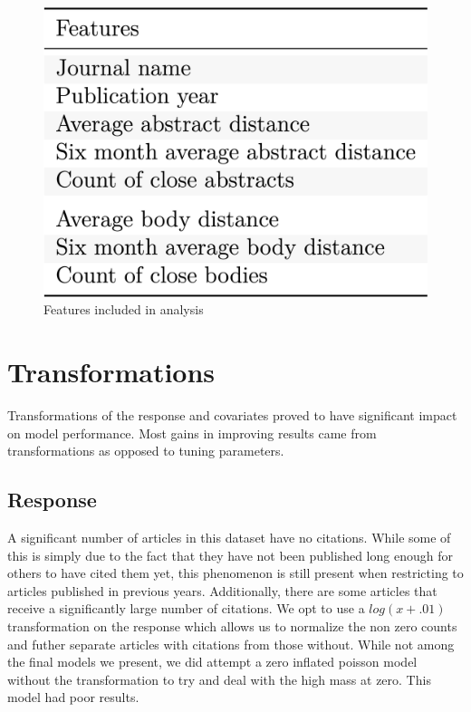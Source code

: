 \documentclass{article} %
\begin{document}
\begin{figure}[h]
\begin{center}
  \includegraphics[scale=0.17]{../Figures/features.png}
\end{center}
\caption{Features included in analysis}
\label{features}
\end{figure}

\section{Transformations}

Transformations of the response and covariates proved to have significant impact on model performance. Most gains in improving results came from transformations as opposed to tuning parameters.

\subsection{Response}
A significant number of articles in this dataset have no citations. While some of this is simply due to the fact that they have not been published long enough for others to have cited them yet, this phenomenon is still present when restricting to articles published in previous years. Additionally, there are some articles that receive a significantly large number of citations. We opt to use a $log(x+.01)$ transformation on the response which allows us to normalize the non zero counts and futher separate articles with citations from those without. While not among the final models we present, we did attempt a zero inflated poisson model without the transformation to try and deal with the high mass at zero. This model had poor results.
\end{document}
